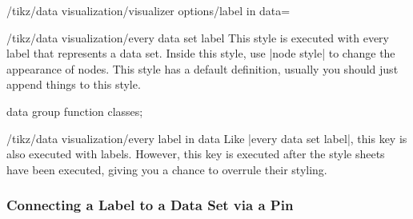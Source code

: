\begin{key}{/tikz/data visualization/visualizer options/label in data=}
    \begin{stylekey}{/tikz/data visualization/every data set label}
        This style is executed with every label that represents a data set.
        Inside this style, use |node style| to change the appearance of nodes.
        This style has a default definition, usually you should just append
        things to this style.
\begin{codeexample}[width=6.3cm]
\tikz \datavisualization [
  school book axes,
  x axis={label=$x$},
  visualize as smooth line/.list={log, lin, squared, exp},
  every data set label/.append style={text colored},
  log=    {label in data={text'=$\log x$, when=y is -1}},
  lin=    {label in data={text=$x/2$,
                    node style=sloped,    when=x is 2}},
  squared={label in data={text=$x^2$,     when=x is 1.1}},
  exp=    {label in data={text=$e^x$,
                    node style=sloped,    when=x is -2}},
  style sheet=vary hue]
data group {function classes};
\end{codeexample}
    \end{stylekey}

    \begin{stylekey}{/tikz/data visualization/every label in data}
        Like |every data set label|, this key is also executed with labels.
        However, this key is executed after the style sheets have been
        executed, giving you a chance to overrule their styling.
    \end{stylekey}
\end{key}


\subsubsection{Connecting a Label to a Data Set via a Pin}

